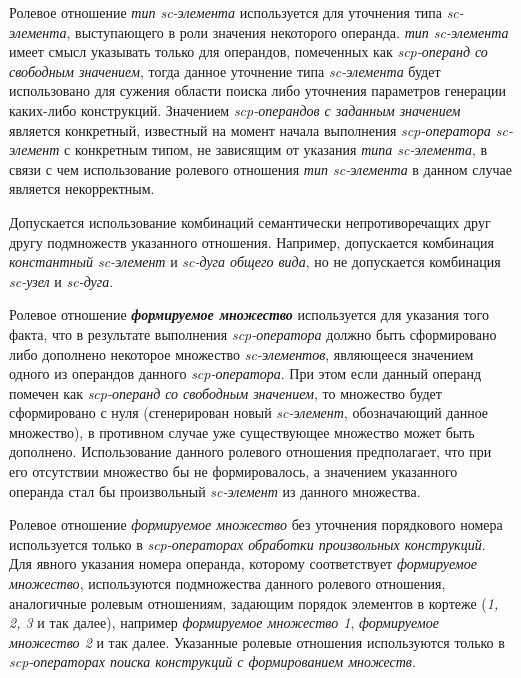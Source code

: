 Ролевое отношение \textit{тип \mbox{sc-элемента\scnrolesign}} используется для уточнения типа \textit{sc-элемента}, выступающего в роли значения некоторого операнда. \textit{тип \mbox{sc-элемента\scnrolesign}} имеет смысл указывать только для операндов, помеченных как \textit{scp-операнд со свободным значением\scnrolesign}, тогда данное уточнение типа \textit{\mbox{sc-элемента}} будет использовано для сужения области поиска либо уточнения параметров генерации каких-либо конструкций. Значением \textit{scp-операндов с заданным значением\scnrolesign} является конкретный, известный на момент начала выполнения \textit{scp-оператора sc-элемент} с конкретным типом, не зависящим от указания \textit{типа sc-элемента\scnrolesign}, в связи с чем использование ролевого отношения \textit{тип sc-элемента\scnrolesign} в данном случае является некорректным.

Допускается использование комбинаций семантически непротиворечащих друг другу подмножеств указанного отношения. Например, допускается комбинация \textit{константный sc-элемент\scnrolesign} и \textit{sc-дуга общего вида\scnrolesign}, но не допускается комбинация \textit{sc-узел\scnrolesign} и \textit{sc-дуга\scnrolesign}.

Ролевое отношение \textbf{\textit{формируемое множество\scnrolesign}} используется для указания того факта, что в результате выполнения \textit{scp-оператора} должно быть сформировано либо дополнено некоторое множество \textit{sc-элементов}, являющееся значением одного из операндов данного \textit{scp-оператора}. При этом если данный операнд помечен как \textit{scp-операнд со свободным значением\scnrolesign}, то множество будет сформировано с нуля (сгенерирован новый \textit{sc-элемент}, обозначающий данное множество), в противном случае уже существующее множество может быть дополнено. Использование данного ролевого отношения предполагает, что при его отсутствии множество бы не формировалось, а значением указанного операнда стал бы произвольный \textit{sc-элемент} из данного множества. 

Ролевое отношение \textit{формируемое множество\scnrolesign} без уточнения порядкового номера используется только в \textit{scp-операторах обработки произвольных конструкций}. Для явного указания номера операнда, которому соответствует \textit{формируемое множество\scnrolesign}, используются подмножества данного ролевого отношения, аналогичные ролевым отношениям, задающим порядок элементов в кортеже (\textit{1\scnrolesign, 2\scnrolesign, 3\scnrolesign} и так далее), например \textit{формируемое множество 1\scnrolesign}, \textit{формируемое множество 2\scnrolesign} и так далее. Указанные ролевые отношения используются только в \textit{scp-операторах поиска конструкций с формированием множеств}.

